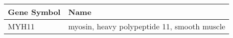 \begin{tabular}{ll}
\toprule
Gene Symbol &                                        Name \\
\midrule
      MYH11 & myosin, heavy polypeptide 11, smooth muscle \\
\bottomrule
\end{tabular}
